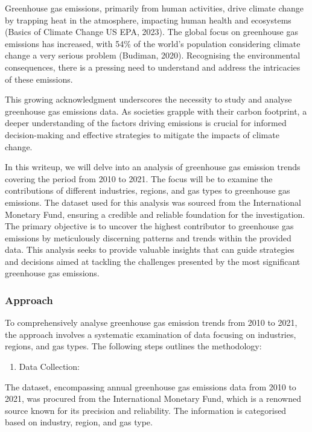 \documentclass[
]{article}
\providecommand{\tightlist}{%
  \setlength{\itemsep}{0pt}\setlength{\parskip}{0pt}}
\begin{document}
Greenhouse gas emissions, primarily from human activities, drive climate
change by trapping heat in the atmosphere, impacting human health and
ecosystems (Basics of Climate Change \textbar{} US EPA, 2023). The
global focus on greenhouse gas emissions has increased, with 54\% of the
world's population considering climate change a very serious problem
(Budiman, 2020). Recognising the environmental consequences, there is a
pressing need to understand and address the intricacies of these
emissions.

This growing acknowledgment underscores the necessity to study and
analyse greenhouse gas emissions data. As societies grapple with their
carbon footprint, a deeper understanding of the factors driving
emissions is crucial for informed decision-making and effective
strategies to mitigate the impacts of climate change.

In this writeup, we will delve into an analysis of greenhouse gas
emission trends covering the period from 2010 to 2021. The focus will be
to examine the contributions of different industries, regions, and gas
types to greenhouse gas emissions. The dataset used for this analysis
was sourced from the International Monetary Fund, ensuring a credible
and reliable foundation for the investigation. The primary objective is
to uncover the highest contributor to greenhouse gas emissions by
meticulously discerning patterns and trends within the provided data.
This analysis seeks to provide valuable insights that can guide
strategies and decisions aimed at tackling the challenges presented by
the most significant greenhouse gas emissions.

\hypertarget{approach}{%
\subsubsection{Approach}\label{approach}}

To comprehensively analyse greenhouse gas emission trends from 2010 to
2021, the approach involves a systematic examination of data focusing on
industries, regions, and gas types. The following steps outlines the
methodology:

\begin{enumerate}
\def\labelenumi{\arabic{enumi}.}
\tightlist
\item
  Data Collection:
\end{enumerate}

The dataset, encompassing annual greenhouse gas emissions data from 2010
to 2021, was procured from the International Monetary Fund, which is a
renowned source known for its precision and reliability. The information
is categorised based on industry, region, and gas type.
\end{document}
